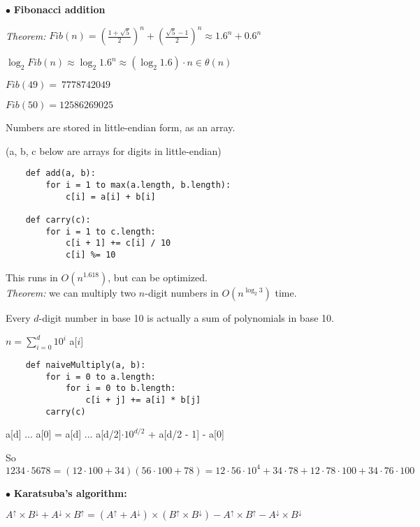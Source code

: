 \documentclass[english]{exam}
\begin{document}
	
    $\bullet$ \textbf{Fibonacci addition}
    
    \textit{Theorem:} $Fib(n) = \left(  \frac{1+\sqrt{5}}{2}  \right) ^n + \left(  \frac{\sqrt{5} - 1}{2}  \right) ^n \approx 1.6^n + 0.6^n$
    
    $\log_2 Fib(n) \approx \log_2 1.6^n \approx (\log_2 1.6) \cdot n \in \theta(n)$
    
    $Fib(49) =\ 7778742049$
    
    $Fib(50) = 12586269025$
    
    Numbers are stored in little-endian form, as an array.
    
    (a, b, c below are arrays for digits in little-endian)
    
    \begin{lstlisting}
    def add(a, b):
        for i = 1 to max(a.length, b.length):
            c[i] = a[i] + b[i]
    
    def carry(c):
        for i = 1 to c.length:
            c[i + 1] += c[i] / 10
            c[i] %= 10
    \end{lstlisting}
    
    This runs in $O(n^{1.618})$, but can be optimized.\\
    
    \textit{Theorem:} we can multiply two $n$-digit numbers in $O(n^{\log_2 3})$ time.
    
    Every $d$-digit number in base 10 is actually a sum of polynomials in base 10.
    
    $n = \sum_{i=0}^{d} 10^i$ a[$i$]
    
    \begin{lstlisting}
    def naiveMultiply(a, b):
        for i = 0 to a.length:
            for i = 0 to b.length:
                c[i + j] += a[i] * b[j]
        carry(c)
    \end{lstlisting}
    
    a[d] ... a[0] = a[d] ... a[d/2]$ \cdot 10^{d/2}$ + a[d/2 - 1] - a[0]
    
    So $1234 \cdot 5678 = (12 \cdot 100 + 34)(56 \cdot 100 + 78) = 12 \cdot 56 \cdot 10^4 + 34 \cdot 78 + 12 \cdot 78 \cdot 100 + 34 \cdot 76 \cdot 100$ 
    
    $\bullet$ \textbf{Karatsuba's algorithm:}
    
    $A^\uparrow \times B^\downarrow + A^\downarrow \times B^\uparrow = (A^\uparrow + A^\downarrow) \times (B^\uparrow \times B^\downarrow) -A^\uparrow \times B^\uparrow - A^\downarrow \times B^\downarrow$
    
\end{document}
